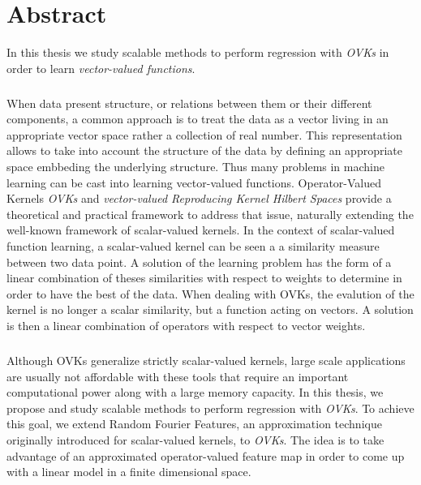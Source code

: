 



\begingroup
\let\clearpage\relax
\let\cleardoublepage\relax
\let\cleardoublepage\relax

\chapter*{Abstract}
In this thesis we study scalable methods to perform regression with \emph{\acl{OVK}s} in order to learn \emph{vector-valued functions}.
\paragraph{}
When data present structure, or relations between them or their different components, a common approach is to treat the data as a vector living in an appropriate vector space rather a collection of real number. This representation allows to take into account the structure of the data by defining an appropriate space embbeding the underlying structure. Thus many problems in machine learning can be cast into learning vector-valued functions. Operator-Valued Kernels \emph{\acl{OVK}s} and \emph{vector-valued Reproducing Kernel Hilbert Spaces} provide a theoretical and practical framework to address that issue, naturally extending the well-known framework of scalar-valued kernels. In the context of scalar-valued function learning, a scalar-valued kernel can be seen a a similarity measure between two data point. A solution of the learning problem has the form of a linear combination of theses similarities with respect to weights to determine in order to have the best  of the data. When dealing with \acl{OVK}s, the evalution of the kernel is no longer a scalar similarity, but a function acting on vectors. A solution is then a linear combination of operators with respect to vector weights.
\paragraph{}
Although \acl{OVK}s generalize strictly scalar-valued kernels, large scale applications are usually not affordable with these tools that require an important computational power along with a large memory capacity. In this thesis, we propose and study scalable methods to perform regression with \emph{\acl{OVK}s}. To achieve this goal, we extend Random Fourier Features, an approximation technique originally introduced for scalar-valued kernels, to \emph{\acl{OVK}s}. The idea is to take advantage of an approximated operator-valued feature map in order to come up with a linear model in a finite dimensional space.
